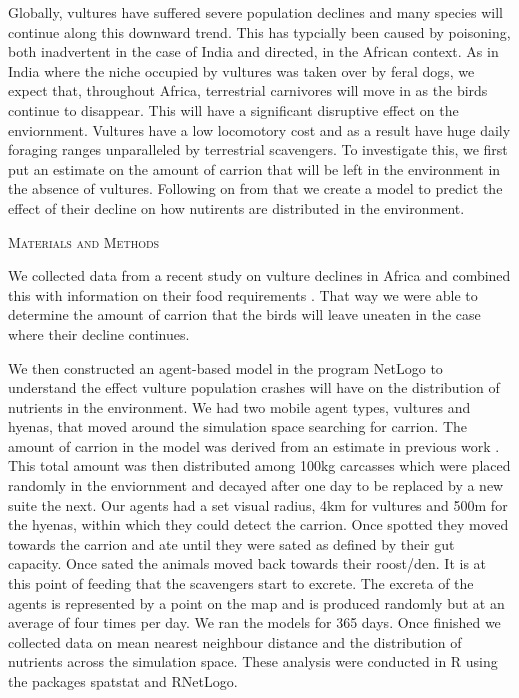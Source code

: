 \documentclass[12pt,letterpaper]{article}
\renewcommand{\section}[1]{%
\bigskip
\begin{center}
\begin{Large}
\normalfont\scshape #1
\medskip
\end{Large}
\end{center}}
\begin{document}
Globally, vultures have suffered severe population declines and many species will continue along this downward trend.
This has typcially been caused by poisoning, both inadvertent in the case of India and directed, in the African context. 
As in India where the niche occupied by vultures was taken over by feral dogs, we expect that, throughout Africa, terrestrial carnivores will move in as the birds continue to disappear. 
This will have a significant disruptive effect on the enviornment.
Vultures have a low locomotory cost and as a result have huge daily foraging ranges unparalleled by terrestrial scavengers. 
To investigate this, we first put an estimate on the amount of carrion that will be left in the environment in the absence of vultures.
Following on from that we create a model to predict the effect of their decline on how nutirents are distributed in the environment. 




%
%
\section{Materials and Methods}
We collected data from a recent study on vulture declines in Africa \cite{CONL12182} and combined this with information on their food requirements \cite{mundy1992vultures}. That way we were able to determine the amount of carrion that the birds will leave uneaten in the case where their decline continues. 

We then constructed an agent-based model in the program NetLogo to understand the effect vulture population crashes will have on the distribution of nutrients in the environment. We had two mobile agent types, vultures and hyenas, that moved around the simulation space searching for carrion. The amount of carrion in the model was derived from an estimate in previous work \cite{ruxton2003could}. This total amount was then distributed among 100kg carcasses which were placed randomly in the enviornment and decayed after one day to be replaced by a new suite the next. Our agents had a set visual radius, 4km for vultures and 500m for the hyenas, within which they could detect the carrion. Once spotted they moved towards the carrion and ate until they were sated as defined by their gut capacity. Once sated the animals moved back towards their roost/den. It is at this point of feeding that the scavengers start to excrete. The excreta of the agents is represented by a point on the map and is produced randomly but at an average of four times per day. We ran the models for 365 days. Once finished we collected data on mean nearest neighbour distance and the distribution of nutrients across the simulation space. These analysis were conducted in R using the packages spatstat and RNetLogo. 
\end{document}
